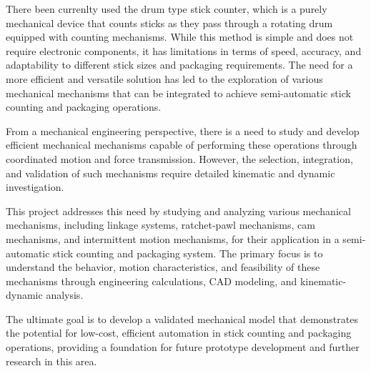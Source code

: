 There been currenlty used the drum type stick counter, which is a purely mechanical device that counts sticks as they pass through a rotating drum equipped with counting mechanisms. While this method is simple and does not require electronic components, it has limitations in terms of speed, accuracy, and adaptability to different stick sizes and packaging requirements. The need for a more efficient and versatile solution has led to the exploration of various mechanical mechanisms that can be integrated to achieve semi-automatic stick counting and packaging operations.
\vspace{12px}

From a mechanical engineering perspective, there is a need to study and develop efficient mechanical mechanisms capable of performing these operations through coordinated motion and force transmission. However, the selection, integration, and validation of such mechanisms require detailed kinematic and dynamic investigation.
\vspace{12px}

This project addresses this need by studying and analyzing various mechanical mechanisms, including linkage systems, ratchet-pawl mechanisms, cam mechanisms, and intermittent motion mechanisms, for their application in a semi-automatic stick counting and packaging system. The primary focus is to understand the behavior, motion characteristics, and feasibility of these mechanisms through engineering calculations, CAD modeling, and kinematic-dynamic analysis. 
\vspace{12px}

The ultimate goal is to develop a validated mechanical model that demonstrates the potential for low-cost, efficient automation in stick counting and packaging operations, providing a foundation for future prototype development and further research in this area.